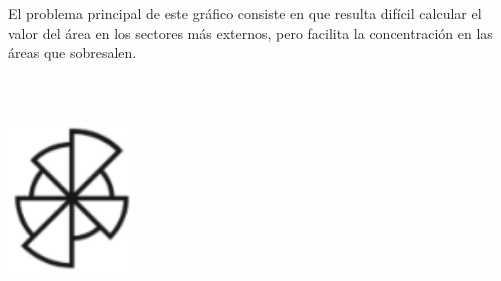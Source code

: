 \documentclass{article}\usepackage[]{graphicx}\usepackage[]{color}
\begin{document}
El problema principal de este gr\'afico consiste en que resulta dif\'icil calcular el valor del \'area en los sectores m\'as externos, pero facilita la concentraci\'on en las \'areas que sobresalen.
~\\~\\~\\~\\
\vbox{
    \centering
    \includegraphics[width=0.25\textwidth]{imag/rose}
}
\clearpage
\end{document}
